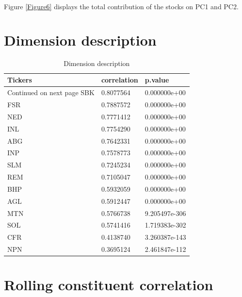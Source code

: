 \documentclass[11pt,preprint, authoryear]{elsarticle}
\numberwithin{equation}{section}
\numberwithin{figure}{section}
\numberwithin{table}{section}
\begin{document}
Figure \ref{Figure6} displays the total contribution of the stocks on
PC1 and PC2.

\hypertarget{dimension-description}{%
\section{Dimension description}\label{dimension-description}}

\begingroup\fontsize{12pt}{13pt}\selectfont
\begin{longtable}{lll}
\caption{Dimension description} \\ 
  \toprule
Tickers & correlation & p.value \\ 
  \hline 
\endhead 
\hline 
{\footnotesize Continued on next page} 
\endfoot 
\endlastfoot 
 \midrule
SBK & 0.8077564 & 0.000000e+00 \\ 
  FSR & 0.7887572 & 0.000000e+00 \\ 
  NED & 0.7771412 & 0.000000e+00 \\ 
  INL & 0.7754290 & 0.000000e+00 \\ 
  ABG & 0.7642331 & 0.000000e+00 \\ 
  INP & 0.7578773 & 0.000000e+00 \\ 
  SLM & 0.7245234 & 0.000000e+00 \\ 
  REM & 0.7105047 & 0.000000e+00 \\ 
  BHP & 0.5932059 & 0.000000e+00 \\ 
  AGL & 0.5912447 & 0.000000e+00 \\ 
  MTN & 0.5766738 & 9.205497e-306 \\ 
  SOL & 0.5741416 & 1.719383e-302 \\ 
  CFR & 0.4138740 & 3.260387e-143 \\ 
  NPN & 0.3695124 & 2.461847e-112 \\ 
   \bottomrule
\end{longtable}
\endgroup

\hypertarget{rolling-constituent-correlation}{%
\section{\texorpdfstring{Rolling constituent correlation
\label{roll}}{Rolling constituent correlation }}\label{rolling-constituent-correlation}}
\end{document}
